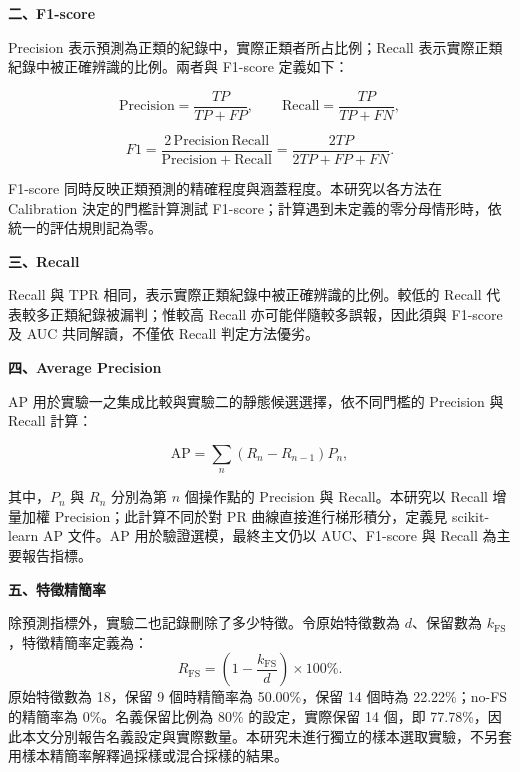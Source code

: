 \textbf{二、F1-score}

Precision 表示預測為正類的紀錄中，實際正類者所占比例；Recall 表示實際正類紀錄中被正確辨識的比例。兩者與 F1-score 定義如下：

\begin{equation}\label{eq:recall}
\mathrm{Precision}=\frac{TP}{TP+FP},\qquad
\mathrm{Recall}=\frac{TP}{TP+FN},
\end{equation}

\begin{equation}\label{eq:method-f1}
F1=\frac{2\,\mathrm{Precision}\,\mathrm{Recall}}
{\mathrm{Precision}+\mathrm{Recall}}
=\frac{2TP}{2TP+FP+FN}.
\end{equation}

F1-score 同時反映正類預測的精確程度與涵蓋程度。本研究以各方法在 Calibration 決定的門檻計算測試 F1-score；計算遇到未定義的零分母情形時，依統一的評估規則記為零。

\textbf{三、Recall}

Recall 與 TPR 相同，表示實際正類紀錄中被正確辨識的比例。較低的 Recall 代表較多正類紀錄被漏判；惟較高 Recall 亦可能伴隨較多誤報，因此須與 F1-score 及 AUC 共同解讀，不僅依 Recall 判定方法優劣。

\textbf{四、Average Precision}

AP 用於實驗一之集成比較與實驗二的靜態候選選擇，依不同門檻的 Precision 與 Recall 計算：

\begin{equation}\label{eq:method-ap}
\mathrm{AP}=\sum_n(R_n-R_{n-1})P_n,
\end{equation}

其中，\(P_n\) 與 \(R_n\) 分別為第 \(n\) 個操作點的 Precision 與 Recall。本研究以 Recall 增量加權 Precision；此計算不同於對 PR 曲線直接進行梯形積分，定義見 scikit-learn AP 文件\autocite{sklearn-ap-docs}。AP 用於驗證選模，最終主文仍以 AUC、F1-score 與 Recall 為主要報告指標。

\textbf{五、特徵精簡率}

除預測指標外，實驗二也記錄刪除了多少特徵。令原始特徵數為 \(d\)、保留數為 \(k_{\mathrm{FS}}\)，特徵精簡率定義為：
\begin{equation}\label{eq:method-reduction}
R_{\mathrm{FS}}=\left(1-\frac{k_{\mathrm{FS}}}{d}\right)\times100\%.
\end{equation}
原始特徵數為 18，保留 9 個時精簡率為 50.00\%，保留 14 個時為 22.22\%；no-FS 的精簡率為 0\%。名義保留比例為 80\% 的設定，實際保留 14 個，即 77.78\%，因此本文分別報告名義設定與實際數量。本研究未進行獨立的樣本選取實驗，不另套用樣本精簡率解釋過採樣或混合採樣的結果。

